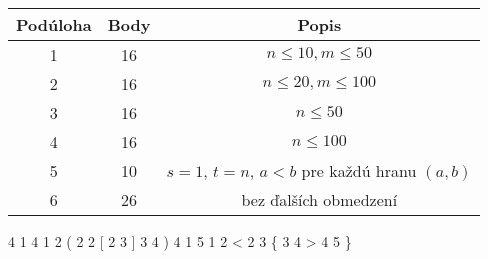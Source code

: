 
\begin{center}
\begin{tabular}{|c|c|c|}
	\hline
	Podúloha & Body  & Popis \\
	\hline
	1 & 16 & $n \leq 10, m\leq 50$ \\
	\hline
	2 & 16 & $n \leq 20, m\leq 100$\\
	\hline
	3 & 16 & $n \leq 50$\\
	\hline
	4 & 16 & $n \leq 100$ \\
	\hline
	5  & 10 & $s = 1$, $t = n$, $a < b$ pre každú hranu $(a,b)$\\
	\hline
	6 & 26  & bez ďalších obmedzení \\
	\hline
\end{tabular}
\end{center}


 4 1 4
1 2 (
2 2 [
2 3 ]
3 4 )
\sampleEND
{} 4 1 5
1 2 <
2 3 \{
3 4 >
4 5 \}

\sampleEND




